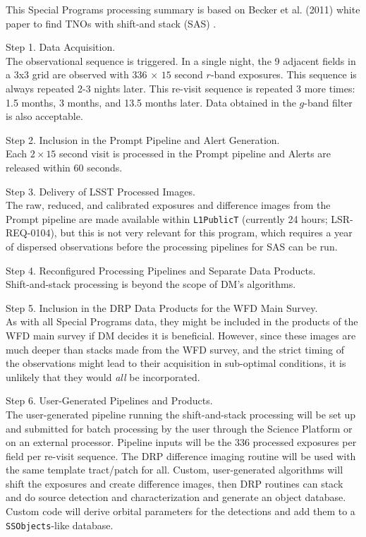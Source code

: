 \documentclass[DM,lsstdoc,toc]{lsstdoc}
\begin{document}
This Special Programs processing summary is based on Becker et al. (2011) white paper to find TNOs with shift-and stack (SAS) .

Step 1. Data Acquisition. \\
The observational sequence is triggered. In a single night, the 9 adjacent fields in a 3x3 grid are observed with $336$ $\times$ $15$ second $r$-band exposures. This sequence is always repeated 2-3 nights later. This re-visit sequence is repeated 3 more times: 1.5 months, 3 months, and 13.5 months later. Data obtained in the $g$-band filter is also acceptable. 

Step 2. Inclusion in the Prompt Pipeline and Alert Generation. \\
Each $2\times15$ second visit is processed in the Prompt pipeline and Alerts are released within 60 seconds.

Step 3. Delivery of LSST Processed Images. \\
The raw, reduced, and calibrated exposures and difference images from the Prompt pipeline are made available within \texttt{L1PublicT} (currently 24 hours; LSR-REQ-0104), but this is not very relevant for this program, which requires a year of dispersed observations before the processing pipelines for SAS can be run.

Step 4. Reconfigured Processing Pipelines and Separate Data Products. \\
Shift-and-stack processing is beyond the scope of DM's algorithms.

Step 5. Inclusion in the DRP Data Products for the WFD Main Survey. \\
As with all Special Programs data, they might be included in the products of the WFD main survey if DM decides it is beneficial. However, since these images are much deeper than stacks made from the WFD survey, and the strict timing of the observations might lead to their acquisition in sub-optimal conditions, it is unlikely that they would \textit{all} be incorporated.

Step 6. User-Generated Pipelines and Products. \\
The user-generated pipeline running the shift-and-stack processing will be set up and submitted for batch processing by the user through the Science Platform or on an external processor. Pipeline inputs will be the 336 processed exposures per field per re-visit sequence. The DRP difference imaging routine will be used with the same template tract/patch for all. Custom, user-generated algorithms will shift the exposures and create difference images, then DRP routines can stack and do source detection and characterization and generate an object database. Custom code will derive orbital parameters for the detections and add them to a {\tt SSObjects}-like database.
\end{document}
